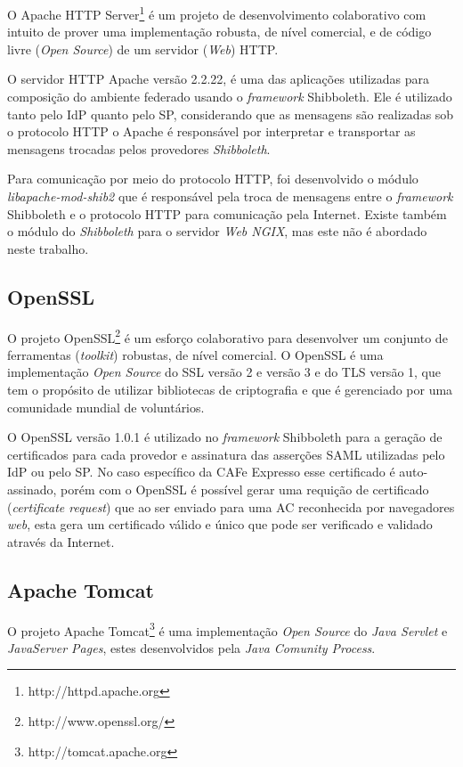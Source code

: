 O Apache HTTP Server\footnote{http://httpd.apache.org} é um projeto de desenvolvimento colaborativo com intuito de prover uma implementação robusta, de nível comercial, e de código livre (\textit{Open Source}) de um servidor (\textit{Web}) HTTP.

O servidor HTTP Apache versão 2.2.22, é uma das aplicações utilizadas para composição do ambiente federado usando o \textit{framework} Shibboleth. Ele é utilizado tanto pelo IdP quanto pelo SP, considerando que as mensagens são realizadas sob o protocolo HTTP o Apache é responsável por interpretar e transportar as mensagens trocadas pelos provedores \textit{Shibboleth}.

Para comunicação por meio do protocolo HTTP, foi desenvolvido o módulo \textit{libapache-mod-shib2} que é responsável pela troca de mensagens entre o \textit{framework} Shibboleth e o protocolo HTTP para comunicação pela Internet. Existe também o módulo do \textit{Shibboleth} para o servidor \textit{Web NGIX}, mas este não é abordado neste trabalho.

\subsection{OpenSSL}

O projeto OpenSSL\footnote{http://www.openssl.org/} é um esforço colaborativo para desenvolver um conjunto de ferramentas (\textit{toolkit}) robustas, de nível comercial. O OpenSSL é uma implementação \textit{Open Source} do \ac{SSL} versão 2 e versão 3 e do \ac{TLS} versão 1, que tem o propósito de utilizar bibliotecas de criptografia e que é gerenciado por uma comunidade mundial de voluntários.

O OpenSSL versão 1.0.1 é utilizado no \textit{framework} Shibboleth para a geração de certificados para cada provedor e assinatura das asserções SAML utilizadas pelo IdP ou pelo SP. No caso específico da CAFe Expresso esse certificado é auto-assinado, porém com o OpenSSL é possível gerar uma requição de certificado (\textit{certificate request}) que ao ser enviado para uma \ac{AC} reconhecida por navegadores \textit{web}, esta gera um certificado válido e único que pode ser verificado e validado através da Internet.

\subsection{Apache Tomcat}

O projeto Apache Tomcat\footnote{http://tomcat.apache.org} é uma implementação \textit{Open Source} do \textit{Java Servlet} e \textit{JavaServer Pages}, estes desenvolvidos pela \textit{Java Comunity Process}.

